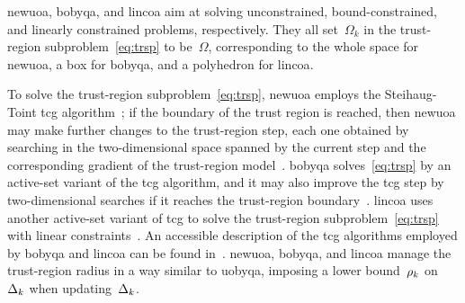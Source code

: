 \documentclass{article}
\numberwithin{equation}{section}
\theoremstyle{definition}
\theoremstyle{plain}
\theoremstyle{remark}
\newcommand{\fsetm}[1][k]{\Omega_{#1}}
\newcommand{\fset}{\Omega}
\newcommand{\radlb}[1][k]{\rho\ifthenelse{\equal{#1}{}}{}{_{#1}}}
\newcommand{\rad}[1][k]{\Delta\ifthenelse{\equal{#1}{}}{}{_{#1}}}
\begin{document}
\Gls{newuoa}, \gls{bobyqa}, and \gls{lincoa} aim at solving unconstrained, bound-constrained, and linearly constrained problems, respectively.
They all set~$\fsetm$ in the trust-region subproblem~\eqref{eq:trsp} to be~$\fset$, corresponding to the whole space for \gls{newuoa}, a box for \gls{bobyqa}, and a polyhedron for \gls{lincoa}.

To solve the trust-region subproblem~\eqref{eq:trsp}, \gls{newuoa} employs the Steihaug-Toint \gls{tcg} algorithm~\cite{Steihaug_1983,Toint_1981}; if the boundary of the trust region is reached, then \gls{newuoa} may make further changes to the trust-region step, each one obtained by searching in the two-dimensional space spanned by the current step and the corresponding gradient of the trust-region model~\cite[\S~5]{Powell_2006}.
\Gls{bobyqa} solves~\eqref{eq:trsp} by an active-set variant of the \gls{tcg} algorithm, and it may also improve the \gls{tcg} step by two-dimensional searches if it reaches the trust-region boundary~\cite[\S~3]{Powell_2009}.
\Gls{lincoa} uses another active-set variant of \gls{tcg} to solve the trust-region subproblem~\eqref{eq:trsp} with linear constraints~\cite[\S~3 and \S~5]{Powell_2015}.
An accessible description of the \gls{tcg} algorithms employed by \gls{bobyqa} and \gls{lincoa} can be found in~\cite[\S\S~6.2.1--6.2.2]{Ragonneau_2022}.
\Gls{newuoa}, \gls{bobyqa}, and \gls{lincoa} manage the trust-region radius in a way similar to \gls{uobyqa}, imposing a lower bound~$\radlb$ on~$\rad$ when updating~$\rad$.
\end{document}
